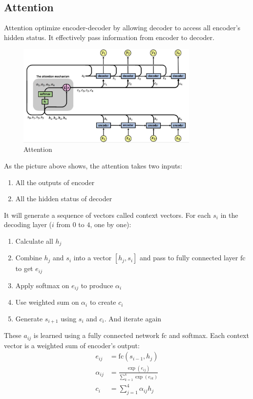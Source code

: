 \subsection{Attention}

Attention optimize encoder-decoder by allowing decoder to access all encoder's hidden status. It effectively pass information from encoder to decoder.

\begin{figure}[H]
\includegraphics[width=0.8\textwidth]{pic/04/attention.jpeg}
\centering
\caption{Attention}
\end{figure}


As the picture above shows, the attention takes two inputs:
\begin{enumerate}
    \item All the outputs of encoder
    \item All the hidden status of decoder
\end{enumerate}

It will generate a sequence of vectors called context vectors. For each $s_i$ in the decoding layer ($i$ from $0$ to $4$, one by one):
\begin{enumerate}
    \item Calculate all $h_j$
    \item Combine $h_j$ and $s_i$ into a vector $[h_j, s_i]$ and pass to fully connected layer $\mathrm{fc}$ to get $e_{ij}$
    \item Apply softmax on $e_{ij}$ to produce $\alpha_i$
    \item Use weighted sum on $\alpha_i$ to create $c_i$
    \item Generate $s_{i+1}$ using $s_i$ and $c_i$. And iterate again
\end{enumerate}


 These $a_{ij}$ is learned using a fully connected network $\mathrm{fc}$ and softmax. Each context vector is a weighted sum of encoder's output:
\begin{equation}
    \begin{aligned}
        e_{ij} &= \mathrm{fc}(s_{i-1}, h_j) \\
        \alpha_{ij} &= \frac{\exp(e_{ij})}{\displaystyle \sum_{k=1}^4 \exp(e_{ik})} \\
        c_i &= \sum_{j=1}^4 \alpha_{ij} h_j
    \end{aligned}
\end{equation}


